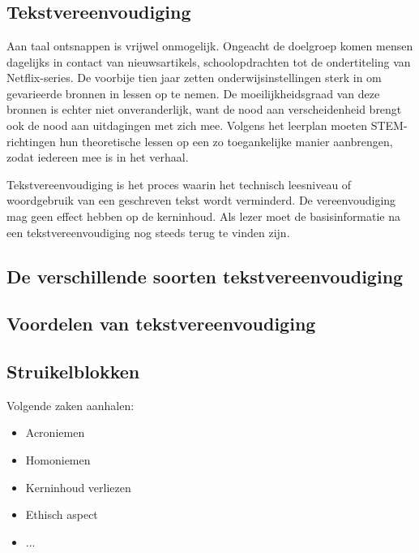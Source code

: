 \chapter{}%
\label{ch:stand-van-zaken}

\section{Tekstvereenvoudiging}

Aan taal ontsnappen is vrijwel onmogelijk. Ongeacht de doelgroep komen mensen dagelijks in contact van nieuwsartikels, schoolopdrachten tot de ondertiteling van Netflix-series. De voorbije tien jaar zetten onderwijsinstellingen sterk in om gevarieerde bronnen in lessen op te nemen. De moeilijkheidsgraad van deze bronnen is echter niet onveranderlijk, want de nood aan verscheidenheid brengt ook de nood aan uitdagingen met zich mee. Volgens het leerplan moeten STEM-richtingen hun theoretische lessen op een zo toegankelijke manier aanbrengen, zodat iedereen mee is in het verhaal. 

Tekstvereenvoudiging is het proces waarin het technisch leesniveau of woordgebruik van een geschreven tekst wordt verminderd. De vereenvoudiging mag geen effect hebben op de kerninhoud. Als lezer moet de basisinformatie na een tekstvereenvoudiging nog steeds terug te vinden zijn.

\section{De verschillende soorten tekstvereenvoudiging}

\section{Voordelen van tekstvereenvoudiging}

\section{Struikelblokken}

Volgende zaken aanhalen:
\begin{itemize}
	\item Acroniemen
	\item Homoniemen
	\item Kerninhoud verliezen
	\item Ethisch aspect
	\item ...
\end{itemize}

